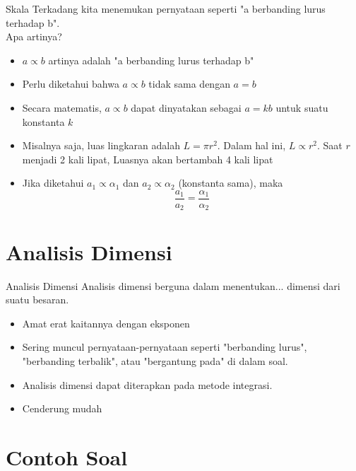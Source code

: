 \documentclass[handout,11pt]{beamer}
\begin{document}
\begin{frame}{Skala}
  Terkadang kita menemukan pernyataan seperti
  "a berbanding lurus terhadap b".\\
  
 Apa artinya?
 \begin{itemize}
   \item $a \propto b$ artinya adalah "a berbanding lurus terhadap b"
   \item Perlu diketahui bahwa $a\propto b$ tidak sama dengan $a=b$
   \item Secara matematis, $a\propto b$ dapat dinyatakan sebagai $a = kb$ untuk suatu konstanta $k$
   \item Misalnya saja, luas lingkaran adalah $L = \pi r^2$. Dalam hal ini, $L \propto r^2$. Saat $r$ menjadi 2 kali lipat, Luasnya akan bertambah 4 kali lipat
   \item Jika diketahui $a_1 \propto \alpha_1$ dan $a_2 \propto \alpha_2$ (konstanta sama), maka
   $$\frac{a_1}{a_2} = \frac{\alpha_1}{\alpha_2}$$
  
 \end{itemize}
\end{frame}

\section{Analisis Dimensi}
\label{sec:Analisis Dimensi}

\begin{frame}{Analisis Dimensi}
  Analisis dimensi berguna dalam menentukan... dimensi dari suatu besaran.
  \begin{itemize}
    \item Amat erat kaitannya dengan eksponen
    \item Sering muncul pernyataan-pernyataan seperti "berbanding lurus", "berbanding terbalik", atau "bergantung pada" di dalam soal.
    \item Analisis dimensi dapat diterapkan pada metode integrasi.
    \item Cenderung mudah
  \end{itemize}
\end{frame}

\section{Contoh Soal}
\label{sec:Contoh Soal}
\end{document}
